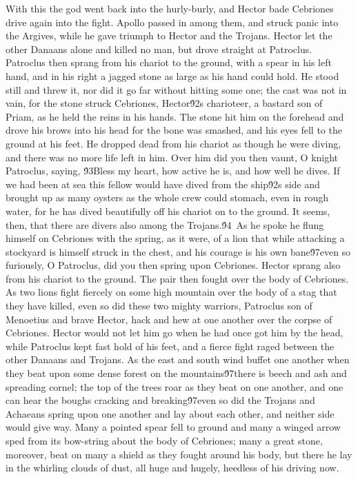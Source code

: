 {With this the god went back into the hurly-burly, and Hector bade Cebriones drive again into the fight. Apollo passed in among them, and struck panic into the Argives, while he gave triumph to Hector and the Trojans. Hector let the other Danaans alone and killed no man, but drove straight at Patroclus. Patroclus then sprang from his chariot to the ground, with a spear in his left hand, and in his right a jagged stone as large as his hand could hold. He stood still and threw it, nor did it go far without hitting some one; the cast was not in vain, for the stone struck Cebriones, Hector\'92s charioteer, a bastard son of Priam, as he held the reins in his hands. The stone hit him on the forehead and drove his brows into his head for the bone was smashed, and his eyes fell to the ground at his feet. He dropped dead from his chariot as though he were diving, and there was no more life left in him. Over him did you then vaunt, O knight Patroclus, saying, \'93Bless my heart, how active he is, and how well he dives. If we had been at sea this fellow would have dived from the ship\'92s side and brought up as many oysters as the whole crew could stomach, even in rough water, for he has dived beautifully off his chariot on to the ground. It seems, then, that there are divers also among the Trojans.\'94\
As he spoke he flung himself on Cebriones with the spring, as it were, of a lion that while attacking a stockyard is himself struck in the chest, and his courage is his own bane\'97even so furiously, O Patroclus, did you then spring upon Cebriones. Hector sprang also from his chariot to the ground. The pair then fought over the body of Cebriones. As two lions fight fiercely on some high mountain over the body of a stag that they have killed, even so did these two mighty warriors, Patroclus son of Menoetius and brave Hector, hack and hew at one another over the corpse of Cebriones. Hector would not let him go when he had once got him by the head, while Patroclus kept fast hold of his feet, and a fierce fight raged between the other Danaans and Trojans. As the east and south wind buffet one another when they beat upon some dense forest on the mountains\'97there is beech and ash and spreading cornel; the top of the trees roar as they beat on one another, and one can hear the boughs cracking and breaking\'97even so did the Trojans and Achaeans spring upon one another and lay about each other, and neither side would give way. Many a pointed spear fell to ground and many a winged arrow sped from its bow-string about the body of Cebriones; many a great stone, moreover, beat on many a shield as they fought around his body, but there he lay in the whirling clouds of dust, all huge and hugely, heedless of his driving now.\
}
